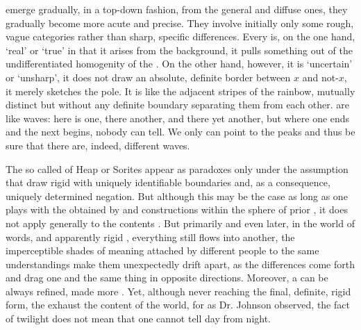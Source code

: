 \pa\label{pa:norigid}  emerge gradually, in a top-down fashion,
from the general and diffuse ones, they gradually become more acute and precise.
They involve initially only some rough, vague categories rather than sharp,
specific differences.  Every  is, on the one hand, `real' or
`true' in that it arises from the background, it pulls something out of the
undifferentiated homogenity of the . On the other hand, however, it is
`uncertain' or `unsharp', it does not draw an absolute, definite border between
$x$ and not-$x$, it merely sketches the  pole. It is like the
adjacent stripes of the rainbow, mutually distinct but without any definite
boundary separating them from each other.   are like waves:
here is one, there another, and there yet another, but where one ends and the
next begins, nobody can tell. We only can point to the peaks and thus be sure
that there are, indeed, different waves.

The so called  of Heap or Sorites  appear as
paradoxes only under the assumption that  draw rigid
 with uniquely identifiable boundaries and, as a consequence,
uniquely determined negation. But although this may be the case as long as one
plays with the  obtained by  and constructions
within the sphere of prior , it does not apply
  generally to
the contents .  But primarily  and even later, in the
world of words,  and apparently rigid , everything
still flows into another, the imperceptible shades of meaning attached by
different people to the same understandings make them unexpectedly drift apart,
as the differences come forth and drag one and the same thing in opposite
directions.  Moreover, a  can be always refined, made more
. Yet, although never reaching the final, definite, rigid form, the
 exhaust the content of the world, for as Dr. Johnson observed,
the fact of twilight does not mean that one cannot tell day from night.


